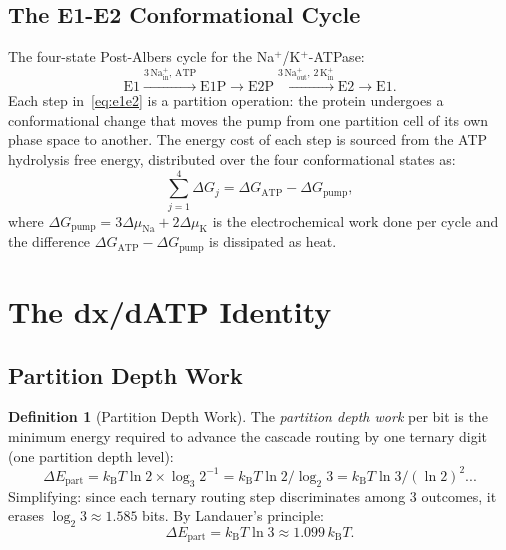 \documentclass[11pt,twocolumn,a4paper]{article}
\theoremstyle{definition}
\newtheorem{definition}[theorem]{Definition}
\theoremstyle{remark}
\newcommand{\kB}{k_{\mathrm{B}}}
\begin{document}
\subsection{The E1-E2 Conformational Cycle}

The four-state Post-Albers cycle \citep{albers1967, post1969} for the Na$^+$/K$^+$-ATPase:
\begin{equation}
\mathrm{E1} \xrightarrow{3\,\mathrm{Na}^+_{\mathrm{in}},\,\mathrm{ATP}}
\mathrm{E1P} \xrightarrow{}
\mathrm{E2P} \xrightarrow{3\,\mathrm{Na}^+_{\mathrm{out}},\,2\,\mathrm{K}^+_{\mathrm{in}}}
\mathrm{E2} \xrightarrow{}
\mathrm{E1}.
\label{eq:e1e2}
\end{equation}
Each step in~\eqref{eq:e1e2} is a partition operation: the protein undergoes a
conformational change that moves the pump from one partition cell of its own
phase space to another. The energy cost of each step is sourced from the ATP
hydrolysis free energy, distributed over the four conformational states as:
\begin{equation}
\sum_{j=1}^4 \Delta G_j = \Delta G_{\mathrm{ATP}} - \Delta G_{\mathrm{pump}},
\label{eq:stepbudget}
\end{equation}
where $\Delta G_{\mathrm{pump}} = 3\Delta\mu_{\mathrm{Na}} + 2\Delta\mu_{\mathrm{K}}$
is the electrochemical work done per cycle and the difference
$\Delta G_{\mathrm{ATP}} - \Delta G_{\mathrm{pump}}$ is dissipated as heat.

\section{The dx/dATP Identity}
\label{sec:dxdatp}

\subsection{Partition Depth Work}

\begin{definition}[Partition Depth Work]
\label{def:partwork}
The \emph{partition depth work} per bit is the minimum energy required to
advance the cascade routing by one ternary digit (one partition depth level):
\begin{equation}
\Delta E_{\mathrm{part}} = \kB T \ln 2 \times \log_3 2^{-1}
= \kB T \ln 2 / \log_2 3
= \kB T \ln 3 / (\ln 2)^2...
\label{eq:partwork}
\end{equation}
Simplifying: since each ternary routing step discriminates among 3 outcomes,
it erases $\log_2 3 \approx 1.585$ bits. By Landauer's principle:
\begin{equation}
\Delta E_{\mathrm{part}} = \kB T \ln 3 \approx 1.099\,\kB T.
\label{eq:partwork2}
\end{equation}
\end{definition}
\end{document}

